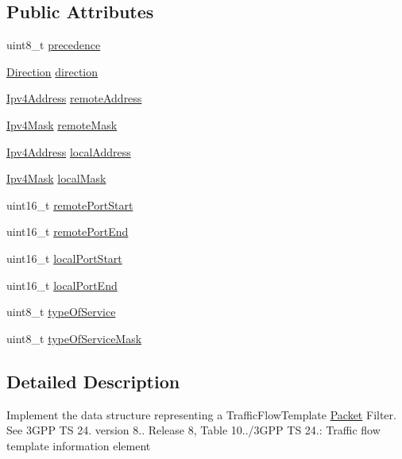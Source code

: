 \subsection*{Public Attributes}
\begin{DoxyCompactItemize}
\item 
uint8\+\_\+t \hyperlink{structns3_1_1EpcTft_1_1PacketFilter_a6130111e1cda6557576a202a3a0adaa2}{precedence}
\item 
\hyperlink{classns3_1_1EpcTft_a6037510585658e017a8011862ce56946}{Direction} \hyperlink{structns3_1_1EpcTft_1_1PacketFilter_a67ce0e33ea4358cffd5651d3a53dfda8}{direction}
\item 
\hyperlink{classns3_1_1Ipv4Address}{Ipv4\+Address} \hyperlink{structns3_1_1EpcTft_1_1PacketFilter_ac6b6b05436c19e55a9d64ff5d8ace9e5}{remote\+Address}
\item 
\hyperlink{classns3_1_1Ipv4Mask}{Ipv4\+Mask} \hyperlink{structns3_1_1EpcTft_1_1PacketFilter_a776b963c9555b388893c5aaab0856afb}{remote\+Mask}
\item 
\hyperlink{classns3_1_1Ipv4Address}{Ipv4\+Address} \hyperlink{structns3_1_1EpcTft_1_1PacketFilter_a091832baf650c7396dfedd456a847a06}{local\+Address}
\item 
\hyperlink{classns3_1_1Ipv4Mask}{Ipv4\+Mask} \hyperlink{structns3_1_1EpcTft_1_1PacketFilter_a419c4f19d00518a9bff3756859306c0b}{local\+Mask}
\item 
uint16\+\_\+t \hyperlink{structns3_1_1EpcTft_1_1PacketFilter_aa96ab9356c91b14059220d00155c32b5}{remote\+Port\+Start}
\item 
uint16\+\_\+t \hyperlink{structns3_1_1EpcTft_1_1PacketFilter_a4bcdd15a9526e27eabd474276f691cf1}{remote\+Port\+End}
\item 
uint16\+\_\+t \hyperlink{structns3_1_1EpcTft_1_1PacketFilter_afd505cda437b1687abc4432a8bcefbaf}{local\+Port\+Start}
\item 
uint16\+\_\+t \hyperlink{structns3_1_1EpcTft_1_1PacketFilter_a3236947a93fdd516b1d978467eaa0484}{local\+Port\+End}
\item 
uint8\+\_\+t \hyperlink{structns3_1_1EpcTft_1_1PacketFilter_abd62754182d9af89f6bc5fdc51a609ae}{type\+Of\+Service}
\item 
uint8\+\_\+t \hyperlink{structns3_1_1EpcTft_1_1PacketFilter_ad97ae3369224f9b909765a6fc473f3e2}{type\+Of\+Service\+Mask}
\end{DoxyCompactItemize}


\subsection{Detailed Description}
Implement the data structure representing a Traffic\+Flow\+Template \hyperlink{classns3_1_1Packet}{Packet} Filter. See 3\+G\+PP TS 24. version 8.. Release 8, Table 10../3\+G\+PP TS 24.\+: Traffic flow template information element

